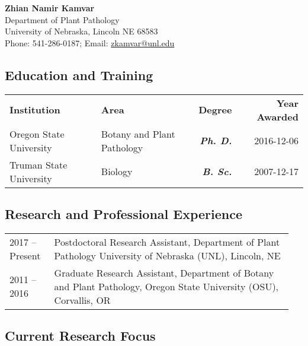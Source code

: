 \documentclass[12pt,letterpaper]{article}
\title{\ruleline{Biographical Sketch}}
\begin{document}
\maketitle

\begin{center}
{\bf Zhian Namir Kamvar}\\
Department of Plant Pathology \\
University of Nebraska, Lincoln NE 68583\\
Phone: 541-286-0187; Email: \href{mailto:zkamvar@unl.edu}{zkamvar@unl.edu}
\end{center}

\subsection*{Education and Training}  

\begin{center}
\begin{tabular}{llrr}%
\textbf{Institution} & \textbf{Area} & \textbf{Degree} & \textbf{Year Awarded}\\
Oregon State University & Botany and Plant Pathology & \textit{\textbf{Ph. D.}} & 2016-12-06\\
Truman State University & Biology  & \textit{\textbf{B. Sc.}} &  2007-12-17
\end{tabular}
\end{center}



\subsection*{Research and Professional Experience}

\begin{tabular}{p{0.15\linewidth}p{0.8\linewidth}}
2017 --	Present & Postdoctoral Research Assistant, Department of Plant Pathology 
			      University of Nebraska (UNL), Lincoln, NE\\
2011 -- 2016    & Graduate Research Assistant, Department of Botany and Plant 
                  Pathology, Oregon State University (OSU), Corvallis, OR
\end{tabular}

\subsection*{Current Research Focus}
\end{document}
